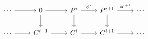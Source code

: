\documentclass[12pt]{standalone}
\begin{document}
        $$

\begin{tikzcd}
    \cdots \ar[r] & 0 \ar[r] \ar[d] & P^i \ar[r,"\phi^i"] \ar[d] & P^{i+1} \ar[r,"\phi^{i+1}"] \ar[d] & \cdots \\
    \cdots \ar[r] & C^{i-1} \ar[r] & C^i \ar[r] & C^{i+1} \ar[r] & \cdots  
\end{tikzcd}
        $$
        
\end{document}
